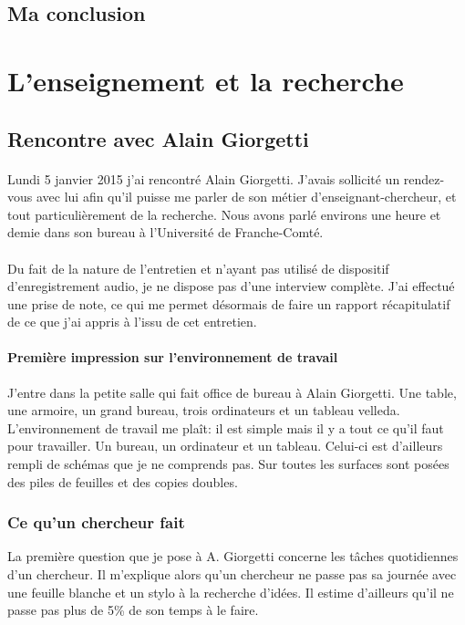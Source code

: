 \documentclass[a4paper,12pt, draft]{report}
\begin{document}
\subsection{Ma conclusion}

\section{L'enseignement et la recherche}
\subsection{Rencontre avec Alain Giorgetti}

\paragraph{}
Lundi 5 janvier 2015 j'ai rencontré Alain Giorgetti. J'avais sollicité un rendez-vous avec lui afin qu'il puisse me parler de son métier d'enseignant-chercheur, et tout particulièrement de la recherche. Nous avons parlé environs une heure et demie dans son bureau à l'Université de Franche-Comté.
\paragraph{}
Du fait de la nature de l'entretien et n'ayant pas utilisé de dispositif d'enregistrement audio, je ne dispose pas d'une interview complète. J'ai effectué une prise de note, ce qui me permet désormais de faire un rapport récapitulatif de ce que j'ai appris à l'issu de cet entretien.

\paragraph{Première impression sur l'environnement de travail}
J'entre dans la petite salle qui fait office de bureau à Alain Giorgetti. Une table, une armoire, un grand bureau, trois ordinateurs et un tableau velleda. L'environnement de travail me plaît: il est simple mais il y a tout ce qu'il faut pour travailler. Un bureau, un ordinateur et un tableau. Celui-ci est d'ailleurs rempli de schémas que je ne comprends pas. Sur toutes les surfaces sont posées des piles de feuilles et des copies doubles.

\subsubsection{Ce qu'un chercheur fait} La première question que je pose à A. Giorgetti concerne les tâches quotidiennes d'un chercheur. Il m'explique alors qu'un chercheur ne passe pas sa journée avec une feuille blanche et un stylo à la recherche d'idées. Il estime d'ailleurs qu'il ne passe pas plus de 5\% de son temps à le faire.
\end{document}
